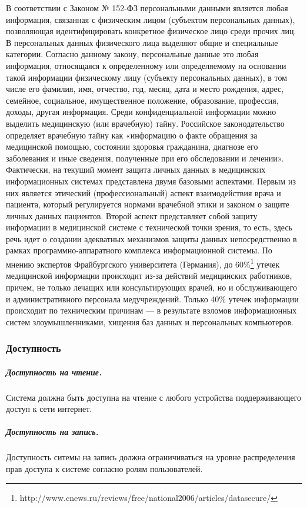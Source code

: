 В соответствии с Законом № 152-ФЗ персональными данными является любая
информация, связанная с физическим лицом (субъектом персональных данных),
позволяющая идентифицировать конкретное физическое лицо среди прочих лиц. В
персональных данных физического лица выделяют общие и специальные категории.
Согласно данному закону, персональные данные это любая информация, относящаяся к
определенному или определяемому на основании такой информации физическому лицу
(субъекту персональных данных), в том числе его фамилия, имя, отчество, год,
месяц, дата и место рождения, адрес, семейное, социальное, имущественное
положение, образование, профессия, доходы, другая информация.
Среди конфиденциальной информации можно выделить медицинскую (или врачебную)
тайну. Российское законодательство определяет врачебную тайну как «информацию о
факте обращения за медицинской помощью, состоянии здоровья гражданина, диагнозе
его заболевания и иные сведения, полученные при его обследовании и лечении».
Фактически, на текущий момент защита личных данных в медицинских информационных
системах представлена  двумя базовыми аспектами.
Первым из них является этический (профессиональный) аспект взаимодействия врача
и пациента, который регулируется нормами врачебной этики и законом о защите
личных данных пациентов.
Второй аспект представляет собой защиту информации в медицинской системе с
технической точки зрения, то есть, здесь речь идет о создании адекватных
механизмов защиты данных непосредственно в рамках программно-аппаратного
комплекса информационной системы.
По мнению экспертов Фрайбургского университета (Германия), до 60\%\footnote{
	http://www.cnews.ru/reviews/free/national2006/articles/datasecure/
} утечек
медицинской информации происходит из-за действий медицинских работников, причем,
не только лечащих или консультирующих врачей, но и обслуживающего и
административного персонала медучреждений. Только 40\% утечек информации
происходит по техническим причинам — в результате взломов информационных систем
злоумышленниками, хищения баз данных и персональных компьютеров.

\subsubsection{Доступность}
\subparagraph{Доступность на чтение.}
Система должна быть доступна на чтение с любого устройства поддерживающего
доступ к сети интернет.
\subparagraph{Доступность на запись.}
Доступность ситемы на запись должна ограничиваться на уровне распределения прав
доступа к системе согласно ролям пользователей.

